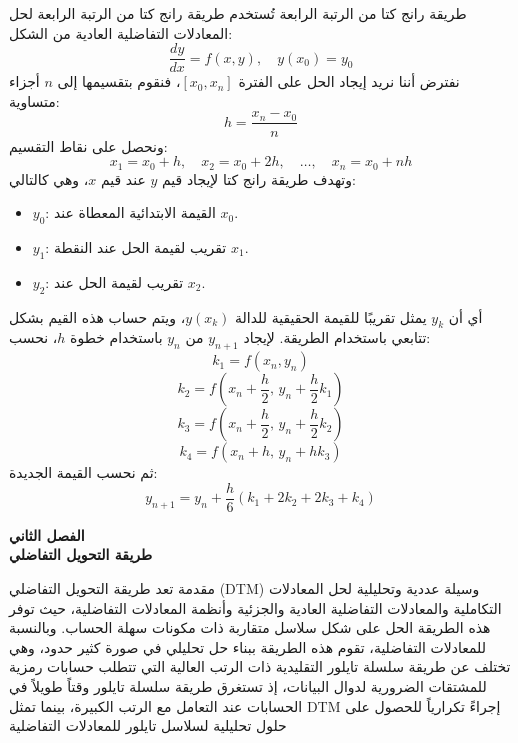 		\begin{frame}{طريقة رانج كتا من الرتبة الرابعة}			
			تُستخدم طريقة رانج كتا من الرتبة الرابعة لحل المعادلات التفاضلية العادية من الشكل:
			\[
			\frac{dy}{dx} = f(x, y), \quad y(x_0) = y_0
			\]
			نفترض أننا نريد إيجاد الحل على الفترة \( [x_0, x_n] \)، فنقوم بتقسيمها إلى \( n \) أجزاء متساوية:
			\[
			h = \frac{x_n - x_0}{n}
			\]
			ونحصل على نقاط التقسيم:
			\[
			x_1 = x_0 + h,\quad x_2 = x_0 + 2h,\quad \dots,\quad x_n = x_0 + nh
			\]
			وتهدف طريقة رانج كتا لإيجاد قيم $y$ عند قيم $x$، وهي كالتالي:
			\begin{itemize}
				\item \( y_0 \): القيمة الابتدائية المعطاة عند \( x_0 \).
				\item \( y_1 \): تقريب لقيمة الحل عند النقطة \( x_1 \).
				\item \( y_2 \): تقريب لقيمة الحل عند \( x_2 \).
			\end{itemize}
		\end{frame}
		
		\begin{frame}
			
			أي أن \( y_k \) يمثل تقريبًا للقيمة الحقيقية للدالة \( y(x_k) \)، ويتم حساب هذه القيم بشكل تتابعي باستخدام الطريقة.
			لإيجاد \( y_{n+1} \) من \( y_n \) باستخدام خطوة \( h \)، نحسب:
			\[
			k_1 = f(x_n, y_n)
			\]
			\[
			k_2 = f\left(x_n + \frac{h}{2}, \, y_n + \frac{h}{2} k_1 \right)
			\]
			\[
			k_3 = f\left(x_n + \frac{h}{2}, \, y_n + \frac{h}{2} k_2 \right)
			\]
			\[
			k_4 = f(x_n + h, \, y_n + h k_3)
			\]
			ثم نحسب القيمة الجديدة:
			\[
			y_{n+1} = y_n + \frac{h}{6} \left( k_1 + 2k_2 + 2k_3 + k_4 \right)
			\]
		\end{frame}
		
		\begin{frame}
			\begin{center}
				\Huge
				\textbf{الفصل الثاني}\\
				\textbf{طريقة التحويل التفاضلي}
			\end{center}
		\end{frame}
		
		\begin{frame}{مقدمة}\doublespacing
			تعد طريقة التحويل التفاضلي (DTM) وسيلة عددية وتحليلية لحل المعادلات التكاملية  والمعادلات التفاضلية العادية والجزئية وأنظمة المعادلات التفاضلية، حيث توفر هذه الطريقة الحل على شكل سلاسل متقاربة ذات مكونات سهلة الحساب. وبالنسبة للمعادلات التفاضلية، تقوم هذه الطريقة ببناء حل تحليلي في صورة كثير حدود، وهي تختلف عن طريقة سلسلة تايلور التقليدية ذات الرتب العالية التي تتطلب حسابات رمزية للمشتقات الضرورية لدوال البيانات، إذ تستغرق طريقة سلسلة تايلور وقتاً طويلاً في الحسابات عند التعامل مع الرتب الكبيرة، بينما تمثل DTM إجراءً تكرارياً للحصول على حلول تحليلية لسلاسل تايلور للمعادلات التفاضلية
		\end{frame}
		
